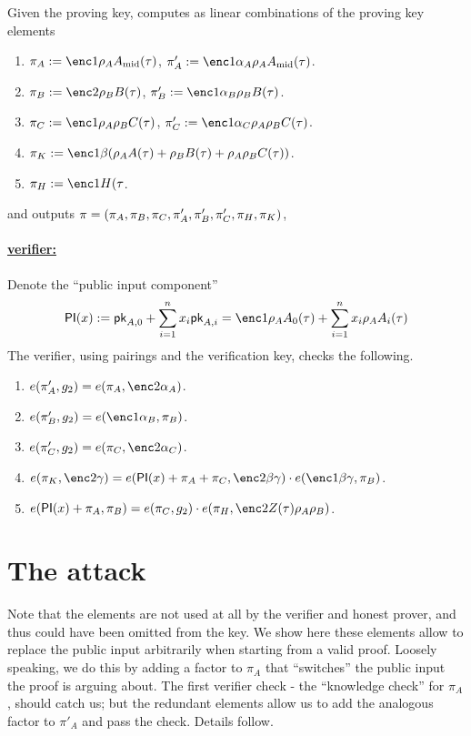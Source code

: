 \documentclass[11pt]{article}
\numberwithin{equation}{section} %
\numberwithin{figure}{section} %
\begin{document}
Given the proving key, \per computes as linear combinations of the proving key elements
\begin{enumerate}
\item $\pi_A\defeq \enc1{\rho_A \Amid(\tau)}$, $\pi'_A\defeq \enc1{\alpha_A\rho_A \Amid(\tau)}$.
\item $\pi_B\defeq \enc2{\rho_B B(\tau)}$, $\pi'_B \defeq \enc1{\alpha_B\rho_B B(\tau)}$.
\item $\pi_C\defeq \enc1{\rho_A\rho_B C(\tau)}$, $\pi'_C \defeq \enc1{\alpha_C\rho_A\rho_B C(\tau)}$.
\item $\pi_K\defeq \enc1{\beta(\rho_A A(\tau) + \rho_B B(\tau) + \rho_A\rho_B C(\tau))}$.
\item $\pi_H\defeq \enc1{H(\tau}$.
 \end{enumerate}
 and outputs $\pi = (\pi_A,\pi_B,\pi_C,\pi'_A,\pi'_B,\pi'_C,\pi_H,\pi_K)$,
 

\paragraph{\underline{\bctv verifier:}\\}
Denote the ``public input component'' 
\[ \PI(x) \defeq \pk_{A,0} + \sum_{i=1}^n x_i \pk_{A,i} = \enc1{\rho_A A_0(\tau) + \sum_{i=1}^n x_i \rho_A A_i(\tau) }\]
 The verifier, using pairings and the verification key, checks the following.
\begin{enumerate}
 \item $e(\pi'_A,g_2)=e(\pi_A,\enc2{\alpha_A})$.
\item $e(\pi'_B, g_2)=e(\enc1{\alpha_B},\pi_B)$.
\item $e(\pi'_C,g_2)=e(\pi_C,\enc2{\alpha_C})$.
\item $e(\pi_K,\enc2{\gamma})=e(\PI(x)+\pi_A+\pi_C,\enc2{\beta\gamma})\cdot e(\enc1{\beta\gamma},\pi_B)$.
\item $e(\PI(x)+\pi_A,\pi_B)= e(\pi_C,g_2)\cdot e(\pi_H,\enc2{Z(\tau)\rho_A\rho_B})$.
 \end{enumerate}
 
 \section{The attack}\label{sec:attack}
 Note that the elements  are not used at all by the verifier and honest prover, and thus could have been omitted from the key. We show here these elements allow to replace the public input arbitrarily when starting from a valid proof.
 Loosely speaking, we do this by adding a factor to $\pi_A$ that ``switches'' the public input the proof is arguing about.
 The first verifier check - the ``knowledge check'' for $\pi_A$, should catch us; but the redundant elements allow us to add
 the analogous factor to $\pi'_A$ and pass the check. Details follow.
 
\end{document}
